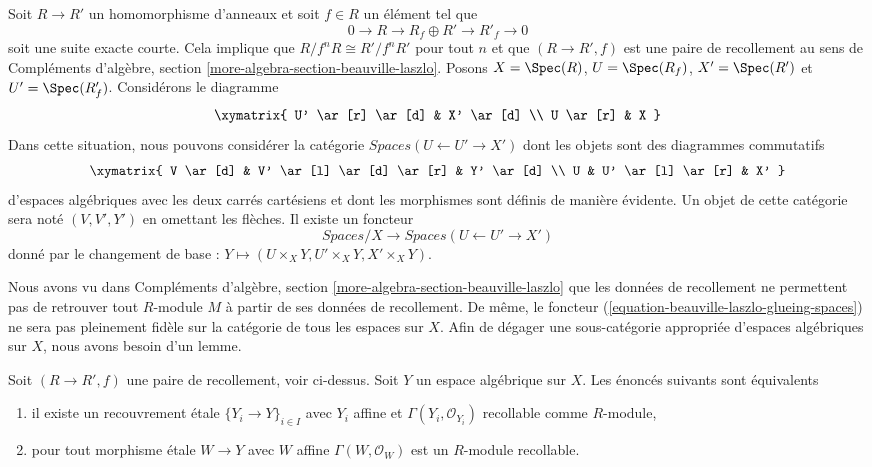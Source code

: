 \noindent
Soit $R \to R'$ un homomorphisme d'anneaux et soit $f \in R$ un élément tel que
$$
0 \to R \to R_f \oplus R' \to R'_f \to 0
$$
soit une suite exacte courte. Cela implique que $R/f^nR \cong R'/f^nR'$
pour tout $n$ et que $(R \to R', f)$ est une paire de recollement au sens de
Compléments d'algèbre, section \ref{more-algebra-section-beauville-laszlo}.
Posons $X = \Spec(R)$, $U = \Spec(R_f)$, $X' = \Spec(R')$ et
$U' = \Spec(R'_f)$. Considérons le diagramme
$$
\xymatrix{
U' \ar[r] \ar[d] & X' \ar[d] \\
U \ar[r] & X
}
$$
Dans cette situation, nous pouvons considérer la catégorie
$\textit{Spaces}(U \leftarrow U' \to X')$ dont les objets
sont des diagrammes commutatifs
$$
\xymatrix{
V \ar[d] & V' \ar[l] \ar[d] \ar[r] & Y' \ar[d] \\
U & U' \ar[l] \ar[r] & X'
}
$$
d'espaces algébriques avec les deux carrés cartésiens et dont les morphismes
sont définis de manière évidente. Un objet de cette catégorie sera
noté $(V, V', Y')$ en omettant les flèches.
Il existe un foncteur
\begin{equation}
\label{equation-beauville-laszlo-glueing-spaces}
\textit{Spaces}/X
\longrightarrow
\textit{Spaces}(U \leftarrow U' \to X')
\end{equation}
donné par le changement de base : $Y \mapsto (U \times_X Y, U' \times_X Y, X' \times_X Y)$.

\medskip\noindent
Nous avons vu dans
Compléments d'algèbre, section \ref{more-algebra-section-beauville-laszlo}
que les données de recollement ne permettent pas de retrouver tout $R$-module $M$ à partir de ses
données de recollement. De même, le foncteur
(\ref{equation-beauville-laszlo-glueing-spaces})
ne sera pas pleinement fidèle sur la catégorie de tous les espaces sur $X$.
Afin de dégager une sous-catégorie appropriée d'espaces algébriques sur $X$, nous avons besoin d'un lemme.

\begin{lemma}
\label{lemma-glueable}
Soit $(R \to R', f)$ une paire de recollement, voir ci-dessus. Soit $Y$ un espace algébrique sur $X$. Les énoncés suivants sont équivalents
\begin{enumerate}
\item il existe un recouvrement \'etale $\{Y_i \to Y\}_{i \in I}$
avec $Y_i$ affine et $\Gamma(Y_i, \mathcal{O}_{Y_i})$
recollable comme $R$-module,
\item pour tout morphisme \'etale $W \to Y$ avec $W$ affine
$\Gamma(W, \mathcal{O}_W)$ est un $R$-module recollable.
\end{enumerate}
\end{lemma}

